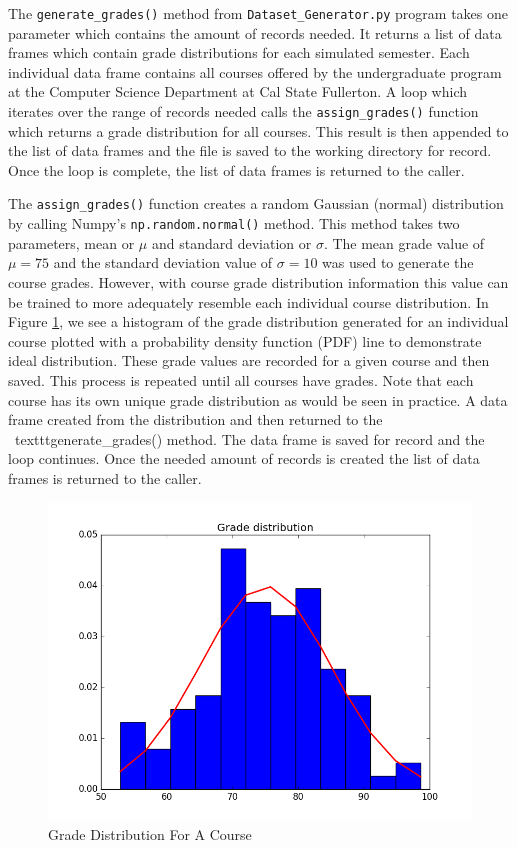 \documentclass[12pt]{article}
\begin{document}
The \texttt{generate\_grades()} method from \texttt{Dataset\_Generator.py} program takes one parameter 
which contains the amount of records needed. It returns a list of data frames which contain grade distributions 
for each simulated semester. Each individual data frame contains all courses offered by the undergraduate 
program at the Computer Science Department at Cal State Fullerton. A loop which iterates over the range of
records needed calls the \texttt{assign\_grades()} function which returns a grade distribution for all courses. 
This result is then appended to the list of data frames and the file is saved to the working directory for record. 
Once the loop is complete, the list of data frames is returned to the caller.

The \texttt{assign\_grades()} function creates a random Gaussian (normal) distribution by calling Numpy's 
\texttt{np.random.normal()} method. This method takes two parameters, mean or $\mu$ and standard deviation or 
$\sigma$. The mean grade value of $\mu=75$ and the standard 
deviation value of $\sigma=10$ was used to generate the course grades. However, with course grade distribution 
information this value can be trained to more adequately resemble each individual course distribution. In Figure 
\ref{fig:fig1}, we see a histogram of the grade distribution generated for an individual course plotted with a probability
density function (PDF) line to demonstrate ideal distribution. These grade values are recorded for a given course 
and then saved. This process is repeated until all courses have grades. Note that each course has its own unique 
grade distribution as would be seen in practice. A data frame created from the distribution and then returned to the \
texttt{generate\_grades()} method. The data frame is saved for record and the loop continues. Once the needed 
amount of records is created the list of data frames is returned to the caller.

\begin{figure}[h]
    \centering
    \includegraphics[scale=0.50]{GradeDistribution}
    \caption{Grade Distribution For A Course}
    \label{fig:fig1}
\end{figure}
\end{document}
